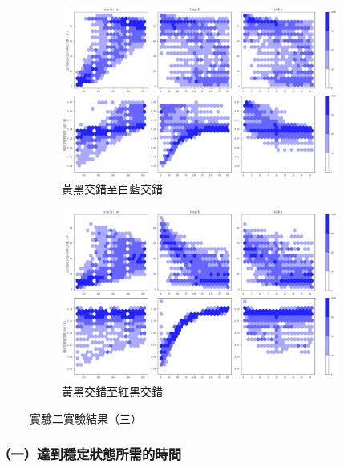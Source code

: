 \documentclass[12pt]{article}
\begin{document}
\begin{figure}[htbp]
  \centering
  \begin{subfigure}[b]{0.9\textwidth}
    \centering
    \includegraphics[width=\textwidth]{img/OutputImg/_Blank_YB.png}
    \caption{黃黑交錯至白藍交錯}
  \end{subfigure}

  \begin{subfigure}[b]{0.9\textwidth}
    \centering
    \includegraphics[width=\textwidth]{img/OutputImg/_Blank_YR.png}
    \caption{黃黑交錯至紅黑交錯}
  \end{subfigure}

  \caption{實驗二實驗結果（三）}\label{fig:result_4}

\end{figure}

\subsubsection{（一）達到穩定狀態所需的時間}
\end{document}
